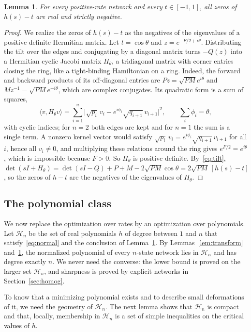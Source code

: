 \documentclass[11pt]{article}
\newtheorem{lemma}[theorem]{Lemma}
\theoremstyle{remark}
\newcommand{\HH}{\mathcal H}
\begin{document}
\begin{lemma}\label{lem:physical}
For every positive-rate network and every $t\in[-1,1]$, all zeros of
$h(s)-t$ are real and strictly negative.
\end{lemma}

\begin{proof}
We realize the zeros of $h(s)-t$ as the negatives of the eigenvalues of a
positive definite Hermitian matrix. Let $t=\cos\theta$ and
$z=e^{-F/2+i\theta}$. Distributing the tilt over the edges and conjugating
by a diagonal matrix turns $-Q(z)$ into a Hermitian cyclic Jacobi matrix
$H_\theta$, a tridiagonal matrix with corner entries closing the ring, like
a tight-binding Hamiltonian on a ring. Indeed, the forward and backward
products of its off-diagonal entries are $Pz=\sqrt{PM}e^{i\theta}$ and
$Mz^{-1}=\sqrt{PM}e^{-i\theta}$, which are complex conjugates. Its
quadratic form is a sum of squares,
\[
\langle v,H_\theta v\rangle=\sum_{i=1}^n
\bigl|\sqrt{p_i}\,v_i-e^{i\phi_i}\sqrt{q_{i+1}}\,v_{i+1}\bigr|^2,
\qquad\sum_i\phi_i=\theta,
\]
with cyclic indices; for $n=2$ both edges are kept and for $n=1$ the sum is a
single term. A nonzero kernel vector would satisfy
$\sqrt{p_i}\,v_i=e^{i\phi_i}\sqrt{q_{i+1}}\,v_{i+1}$ for all $i$, hence all
$v_i\neq0$, and multiplying these relations around the ring gives
$e^{F/2}=e^{i\theta}$, which is impossible because $F>0$. So $H_\theta$ is
positive definite. By~\eqref{eq:tilt},
$\det(sI+H_\theta)=\det(sI-Q)+P+M-2\sqrt{PM}\cos\theta=2\sqrt{PM}\,[h(s)-t]$,
so the zeros of $h-t$ are the negatives of the eigenvalues of $H_\theta$.
\end{proof}

\subsection{The polynomial class}
We now replace the optimization over rates by an optimization over
polynomials. Let $\HH_n$ be the set of real polynomials $h$ of degree
between $1$ and $n$ that satisfy~\eqref{eq:normal} and the conclusion of
Lemma~\ref{lem:physical}. By Lemmas~\ref{lem:transform}
and~\ref{lem:physical}, the normalized polynomial of every $n$-state network
lies in $\HH_n$ and has degree exactly $n$. We never need the converse: the
lower bound is proved on the larger set $\HH_n$, and sharpness is proved by
explicit networks in Section~\ref{sec:homog}.

To know that a minimizing polynomial exists and to describe small
deformations of it, we need the geometry of $\HH_n$. The next lemma shows
that $\HH_n$ is compact and that, locally, membership in $\HH_n$ is a set
of simple inequalities on the critical values of $h$.
\end{document}

